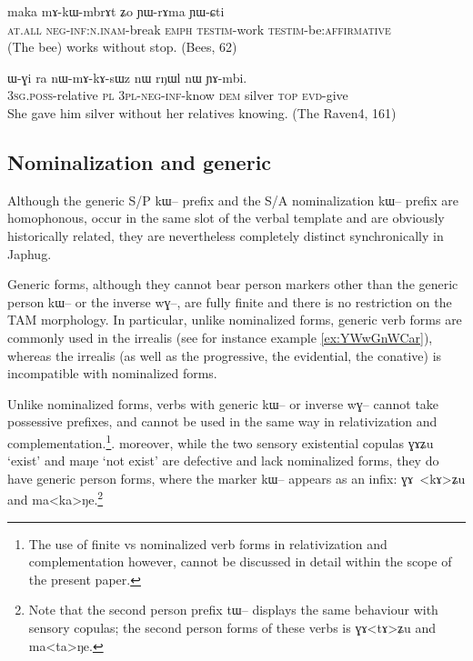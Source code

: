 \documentclass[oldfontcommands,oneside,a4paper,11pt]{article}
\newcommand{\ipa}[1]{{\phon \mbox{#1}}} %
\begin{document}
\begin{exe}
\ex \label{ex:mAkWmbrAt}
\gll
\ipa{maka} 	\ipa{mɤ-kɯ-mbrɤt} 	\ipa{ʑo} 	\ipa{ɲɯ-rɤma} 	\ipa{ɲɯ-ɕti}  \\
\textsc{at.all} \textsc{neg-inf:n.inam}-break \textsc{emph} \textsc{testim}-work \textsc{testim}-be:\textsc{affirmative} \\
\glt (The bee) works without stop. (Bees, 62)
 \end{exe}
 
 \begin{exe}
\ex \label{ex:nWmAkAsWz}
\gll
\ipa{ɯ-ɣi}   	\ipa{ra}   	\ipa{nɯ-mɤ-kɤ-sɯz}   	\ipa{nɯ}   	\ipa{rŋɯl}   	\ipa{nɯ}   	\ipa{ɲɤ-mbi.}   \\
\textsc{3sg.poss}-relative \textsc{pl} \textsc{3pl-neg-inf}-know \textsc{dem} silver \textsc{top} \textsc{evd}-give \\
\glt  She gave him silver without her relatives knowing. (The Raven4, 161)
\end{exe}


 \subsection{Nominalization and generic}  
Although the generic S/P \ipa{kɯ--} prefix and the S/A nominalization \ipa{kɯ--} prefix are homophonous, occur in the same slot of the verbal template and are obviously historically related, they are nevertheless completely distinct synchronically in Japhug. 

Generic forms, although they cannot bear person markers other than the generic  person \ipa{kɯ--} or the inverse \ipa{wɣ--}, are fully finite and there is no restriction on the TAM morphology. In particular, unlike nominalized forms, generic verb forms are commonly used in the irrealis (see for instance example \ref{ex:YWwGnWCar}), whereas the irrealis (as well as the progressive, the evidential, the conative) is incompatible with  nominalized forms.

Unlike nominalized forms,  verbs with generic \ipa{kɯ--} or   inverse \ipa{wɣ--} cannot take possessive prefixes, and cannot be used in the same way in relativization and complementation.\footnote{The use of finite vs nominalized verb forms in relativization and complementation however, cannot be discussed in detail within the scope of the present paper.}. moreover, while the  two sensory existential copulas \ipa{ɣɤʑu} `exist' and \ipa{maŋe} `not exist'  are defective and lack nominalized forms, they do have generic person forms, where the marker \ipa{kɯ--}   appears  as an infix: \ipa{ɣɤ
<kɤ>ʑu} and \ipa{ma<ka>ŋe}.\footnote{Note that the second person prefix \ipa{tɯ--} displays the same behaviour with sensory copulas; the second person forms of these verbs is \ipa{ɣɤ<tɤ>ʑu} and \ipa{ma<ta>ŋe}. } 
\end{document}
